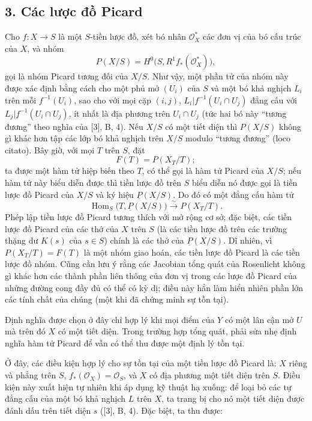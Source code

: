 \subsection*{3. Các lược đồ Picard}

Cho $f:X\longrightarrow S$ là một $S$-tiền lược đồ, xét bó nhân
$\mathcal O_X^*$ các đơn vị của bó cấu trúc của $X$, và nhóm
\[
  P(X/S)=H^0\bigl(S,R^1f_*(\mathcal O_X^*)\bigr),
\]
gọi là nhóm Picard tương đối của $X/S$. Như vậy, một phần tử của nhóm này được
xác định bằng cách cho một phủ mở $(U_i)$ của $S$ và một bó khả nghịch $L_i$
trên mỗi $f^{-1}(U_i)$, sao cho với mọi cặp $(i,j)$,
$L_i|f^{-1}(U_i\cap U_j)$ đẳng cấu với
$L_j|f^{-1}(U_i\cap U_j)$, ít nhất là địa phương trên $U_i\cap U_j$ (tức hai bó
này ``tương đương'' theo nghĩa của [3], B, 4). Nếu $X/S$ có một tiết diện thì
$P(X/S)$ không gì khác hơn tập các lớp bó khả nghịch trên $X/S$ modulo
``tương đương'' (loco citato). Bây giờ, với mọi $T$ trên $S$, đặt
\[
  F(T)=P(X_T/T) ;
\]
ta được một hàm tử hiệp biến theo $T$, có thể gọi là hàm tử Picard của $X/S$;
nếu hàm tử này biểu diễn được thì tiền lược đồ trên $S$ biểu diễn nó được gọi
là tiền lược đồ Picard của $X/S$ và ký hiệu $\underline P(X/S)$. Do đó có một
đẳng cấu hàm tử
\[
  \operatorname{Hom}_S\bigl(T,\underline P(X/S)\bigr)
  \xrightarrow{\sim}P(X_T/T).
\]
Phép lập tiền lược đồ Picard tương thích với mở rộng cơ sở; đặc biệt, các tiền
lược đồ Picard của các thớ của $X$ trên $S$ (là các tiền lược đồ trên các
trường thặng dư $K(s)$ của $s\in S$) chính là các thớ của
$\underline P(X/S)$. Dĩ nhiên, vì $P(X_T/T)=F(T)$ là một nhóm giao hoán, các
tiền lược đồ Picard là các tiền lược đồ nhóm. Cũng cần lưu ý rằng các Jacobian
tổng quát của Rosenlicht không gì khác hơn các thành phần liên thông của đơn
vị trong các lược đồ Picard của những đường cong đầy đủ có thể có kỳ dị; điều
này hẳn làm hiển nhiên phần lớn các tính chất của chúng (một khi đã chứng minh
sự tồn tại).

 Định nghĩa được chọn ở đây chỉ hợp lý khi mọi điểm của
$Y$ có một lân cận mở $U$ mà trên đó $X$ có một tiết diện. Trong trường hợp
tổng quát, phải sửa nhẹ định nghĩa hàm tử Picard để vẫn có thể thu được một
định lý tồn tại.

Ở đây, các điều kiện hợp lý cho sự tồn tại của một tiền lược đồ Picard là:
$X$ riêng và phẳng trên $S$, $f_*(\mathcal O_X)=\mathcal O_S$, và $X$ có địa
phương một tiết diện trên $S$. Điều kiện này xuất hiện tự nhiên khi áp dụng kỹ
thuật hạ xuống: để loại bỏ các tự đẳng cấu của một bó khả nghịch $L$ trên $X$,
ta trang bị cho nó một tiết diện được đánh dấu trên tiết diện $s$ ([3], B, 4).
Đặc biệt, ta thu được:

